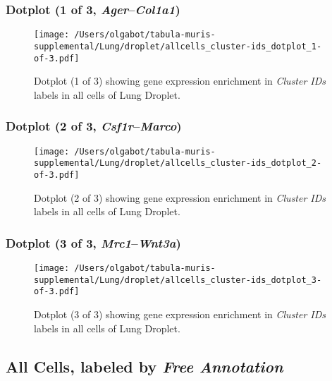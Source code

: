 \clearpage

\subsubsection{Dotplot (1 of 3, \emph{Ager}--\emph{Col1a1})}
\begin{figure}[h]
\centering
\texttt{[image: /Users/olgabot/tabula-muris-supplemental/Lung/droplet/allcells\_cluster-ids\_dotplot\_1-of-3.pdf]}

\caption{ Dotplot (1 of 3)  showing gene expression enrichment in \emph{Cluster IDs} labels in all cells of Lung Droplet. }
\end{figure}


\clearpage

\subsubsection{Dotplot (2 of 3, \emph{Csf1r}--\emph{Marco})}
\begin{figure}[h]
\centering
\texttt{[image: /Users/olgabot/tabula-muris-supplemental/Lung/droplet/allcells\_cluster-ids\_dotplot\_2-of-3.pdf]}

\caption{ Dotplot (2 of 3)  showing gene expression enrichment in \emph{Cluster IDs} labels in all cells of Lung Droplet. }
\end{figure}


\clearpage

\subsubsection{Dotplot (3 of 3, \emph{Mrc1}--\emph{Wnt3a})}
\begin{figure}[h]
\centering
\texttt{[image: /Users/olgabot/tabula-muris-supplemental/Lung/droplet/allcells\_cluster-ids\_dotplot\_3-of-3.pdf]}

\caption{ Dotplot (3 of 3)  showing gene expression enrichment in \emph{Cluster IDs} labels in all cells of Lung Droplet. }
\end{figure}


\clearpage

\subsection{All Cells, labeled by \emph{Free Annotation}}
